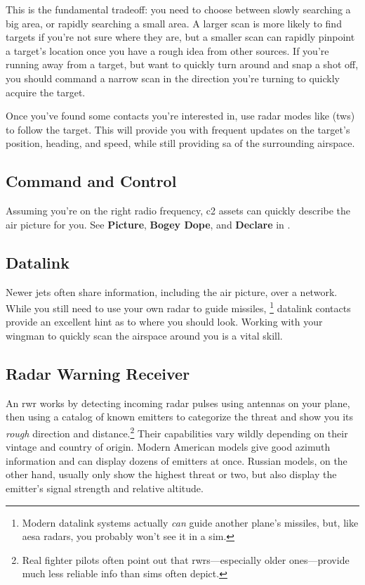 This is the fundamental tradeoff: you need to choose between
slowly searching a big area, or rapidly searching a small area.
A larger scan is more likely to find targets if you're not sure where they are,
but a smaller scan can rapidly pinpoint a target's
location once you have a rough idea from other sources.
If you're running away from a target, but want to quickly turn around and
snap a shot off,
you should command a narrow scan in the direction you're turning
to quickly acquire the target.

Once you've found some contacts you're interested in,
use radar modes like  \ac{(tws)}
to follow the target.
This will provide you with frequent updates on the target's position, heading,
and speed, while still providing \ac{sa} of the surrounding airspace.

\subsection{Command and Control}

Assuming you're on the right radio frequency,
\ac{c2} assets can quickly describe the air picture for you.
See \textbf{Picture}, \textbf{Bogey Dope},
and \textbf{Declare} in .

\subsection{Datalink}

Newer jets often share information, including the air picture,
over a  network.
While you still need to use your own radar to guide missiles,\punckern%
\footnote{Modern datalink systems actually \emph{can} guide another plane's
missiles, but, like \ac{aesa} radars, you probably won't see it in a sim.}
datalink contacts provide an excellent hint as to where you should look.
Working with your wingman to quickly scan the airspace around
you is a vital skill.

\subsection{Radar Warning Receiver}

An \ac{rwr} works by detecting incoming radar pulses
using antennas on your plane,
then using a catalog of known emitters to categorize the threat
and show you its \emph{rough} direction and distance.\punckern\footnote{Real
fighter pilots often point out that \ac{rwr}s---especially older
ones---provide much less reliable info than sims often depict.}
Their capabilities vary wildly depending on their vintage and country of origin.
Modern American models give good azimuth information
and can display dozens of emitters at once.
Russian models, on the other hand,
usually only show the highest threat or two,
but also display the emitter's signal strength and relative altitude.

